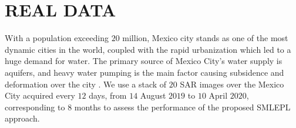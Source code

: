 \vspace{-5pt} 
\section{REAL DATA}
\label{sec:real_data}
\vspace{-5pt} 
With a population exceeding $20$ million, Mexico city stands as one of the most dynamic cities in the world, coupled with the rapid urbanization which led to a huge demand for water. The primary source of Mexico City's water supply is aquifers, and heavy water pumping is the main factor causing subsidence and deformation over the city \cite{yan2012mexico}.
We use a stack of $20$ \acs{SAR} images over the Mexico City acquired every $12$ days, from $14$ August $2019$ to $10$ April $2020$, corresponding to $8$ months to assess the performance of the proposed \acs{SMLEPL} approach.
